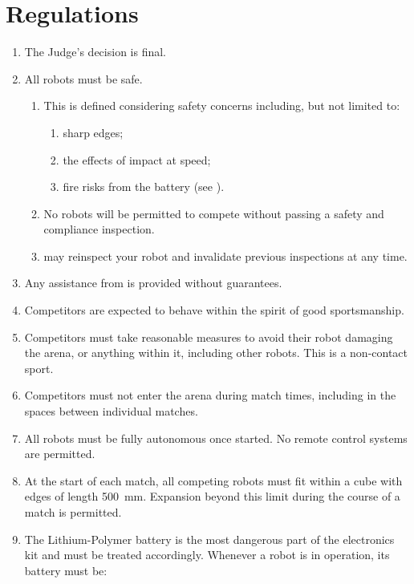\section{Regulations}
\label{sec:regs}

\begin{enumerate}
\item The Judge's decision is final.
\item All robots must be safe.
  \begin{enumerate}
    \item This is defined considering safety concerns including, but not limited
          to:
      \begin{enumerate}
        \item sharp edges;
        \item the effects of impact at speed;
        \item fire risks from the battery (see ).
      \end{enumerate}
    \item No robots will be permitted to compete without passing a safety and
          compliance inspection.
    \item \staff may reinspect your robot and invalidate previous inspections at
          any time.
  \end{enumerate}
\item Any assistance from \staff is provided without
      guarantees.
\item Competitors are expected to behave within the spirit of good
      sportsmanship.
\item Competitors must take reasonable measures to avoid their robot damaging
      the arena, or anything within it, including other robots. This is a
      non-contact sport.
\item Competitors must not enter the arena during match times, including in the
      spaces between individual matches.
\item All robots must be fully autonomous once started. No remote control
      systems are permitted.
\item At the start of each match, all competing robots must fit within a cube
      with edges of length \SI{500}{mm}. Expansion beyond this limit during the
      course of a match is permitted.
\item \label{reg:lipo}
      The Lithium-Polymer battery is the most dangerous part of the electronics
      kit and must be treated accordingly. Whenever a robot is in operation,
      its battery must be:

\end{enumerate}
